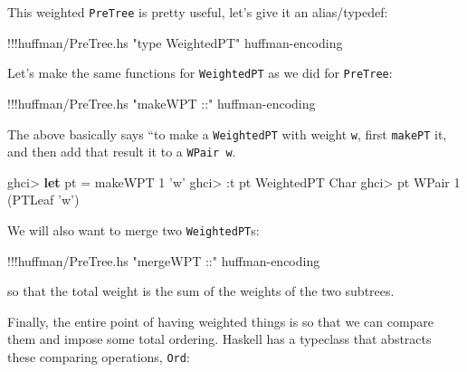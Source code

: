 \documentclass[]{article}
\newenvironment{Shaded}{}{}
\newcommand{\KeywordTok}[1]{\textcolor[rgb]{0.00,0.44,0.13}{\textbf{{#1}}}}
\newcommand{\DataTypeTok}[1]{\textcolor[rgb]{0.56,0.13,0.00}{{#1}}}
\newcommand{\DecValTok}[1]{\textcolor[rgb]{0.25,0.63,0.44}{{#1}}}
\newcommand{\CharTok}[1]{\textcolor[rgb]{0.25,0.44,0.63}{{#1}}}
\newcommand{\StringTok}[1]{\textcolor[rgb]{0.25,0.44,0.63}{{#1}}}
\newcommand{\FunctionTok}[1]{\textcolor[rgb]{0.02,0.16,0.49}{{#1}}}
\newcommand{\NormalTok}[1]{{#1}}
\begin{document}
This weighted \texttt{PreTree} is pretty useful, let's give it an
alias/typedef:

\begin{Shaded}
\begin{Highlighting}[]
\FunctionTok{!!!}\NormalTok{huffman}\FunctionTok{/}\NormalTok{PreTree.hs }\StringTok{"type WeightedPT"} \NormalTok{huffman}\FunctionTok{-}\NormalTok{encoding}
\end{Highlighting}
\end{Shaded}

Let's make the same functions for \texttt{WeightedPT} as we did for
\texttt{PreTree}:

\begin{Shaded}
\begin{Highlighting}[]
\FunctionTok{!!!}\NormalTok{huffman}\FunctionTok{/}\NormalTok{PreTree.hs }\StringTok{"makeWPT ::"} \NormalTok{huffman}\FunctionTok{-}\NormalTok{encoding}
\end{Highlighting}
\end{Shaded}

The above basically says ``to make a \texttt{WeightedPT} with weight
\texttt{w}, first \texttt{makePT} it, and then add that result it to a
\texttt{WPair\ w}.

\begin{Shaded}
\begin{Highlighting}[]
\NormalTok{ghci}\FunctionTok{>} \KeywordTok{let} \NormalTok{pt }\FunctionTok{=} \NormalTok{makeWPT }\DecValTok{1} \CharTok{'w'}
\NormalTok{ghci}\FunctionTok{>} \FunctionTok{:}\NormalTok{t pt}
\DataTypeTok{WeightedPT} \DataTypeTok{Char}
\NormalTok{ghci}\FunctionTok{>} \NormalTok{pt}
\DataTypeTok{WPair} \DecValTok{1} \NormalTok{(}\DataTypeTok{PTLeaf} \CharTok{'w'}\NormalTok{)}
\end{Highlighting}
\end{Shaded}

We will also want to merge two \texttt{WeightedPT}s:

\begin{Shaded}
\begin{Highlighting}[]
\FunctionTok{!!!}\NormalTok{huffman}\FunctionTok{/}\NormalTok{PreTree.hs }\StringTok{"mergeWPT ::"} \NormalTok{huffman}\FunctionTok{-}\NormalTok{encoding}
\end{Highlighting}
\end{Shaded}

so that the total weight is the sum of the weights of the two subtrees.

Finally, the entire point of having weighted things is so that we can
compare them and impose some total ordering. Haskell has a typeclass
that abstracts these comparing operations, \texttt{Ord}:
\end{document}
